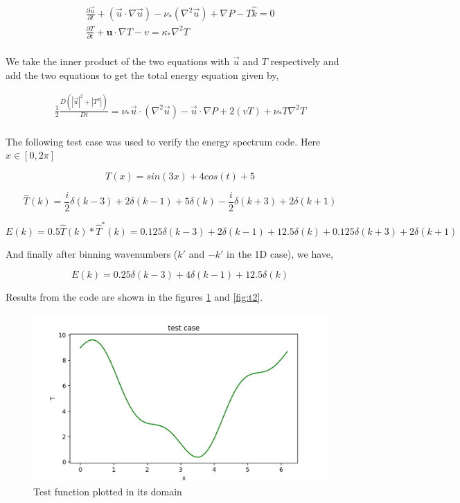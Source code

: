 \documentclass[12pt]{article}
\newcommand{\lapl}{\nabla^{2}}
\newcommand{\lr}[1]{\left(#1\right)}
\begin{document}
    
    \begin{align}
    \frac{\partial \vec{u}}{\partial t} + \lr{\vec{u} \cdot \nabla \vec{u}} - \nu_*\lr{\lapl \vec{u}} + \nabla P - T\hat k = 0 \\
    \frac{\partial T}{\partial t} + \mathbf{u}\cdot\nabla T - v = \kappa_{*}\lapl T \\
    \end{align}
    
    We take the inner product of the two equations with $\vec{u}$ and $T$ respectively and add the two equations to get the total energy equation given by,
    
    \begin{align}
    \frac{1}{2}\frac{D\lr{|\vec{u}|^2 + |{T}^2|}}{D t} = \nu_*\vec u \cdot \lr{\lapl \vec{u}} - \vec u \cdot \nabla P  +  2(vT) + \nu_* T \lapl T\\
    \end{align}
    
    The following test case was used to verify the energy spectrum code. Here $x \in [0,2\pi]$ 
    
    $$T(x) = sin(3x) + 4cos(t) + 5$$
    
    $$\hat {T}(k) = \frac{i}{2} \delta(k-3) + 2 \delta(k-1) + 5 \delta(k) -  \frac{i}{2} \delta(k+3) + 2 \delta(k+1)$$
    
    $$ E(k) = 0.5 \hat {T}(k) * \hat {T}^*(k) = 0.125 \delta(k-3) + 2 \delta(k-1) + 12.5 \delta(k) + 0.125 \delta(k+3) + 2 \delta(k+1)$$
    
    And finally after binning wavenumbers ($k'$ and $-k'$ in the 1D case), we have,
    
    $$ E(k) = 0.25\delta(k-3) + 4\delta(k-1) + 12.5\delta(k)$$
    
    Results from the code are shown in the figures \ref{fig:t1} and \ref{fig:t2}.

   \begin{figure}[!htb]
   	\includegraphics[width=\linewidth]{test1.png}
   	\caption{Test function plotted in its domain}
   	\label{fig:t1}
   \end{figure}
   
\end{document}
